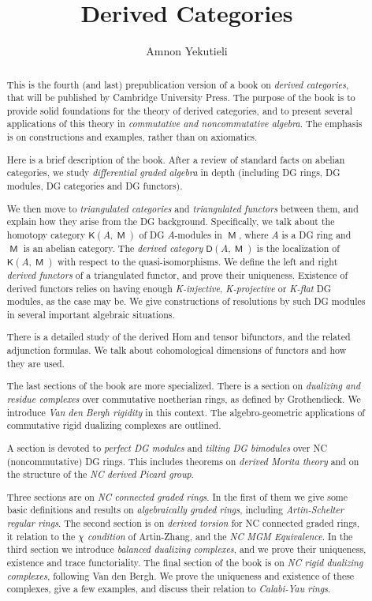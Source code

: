 \documentclass[10pt, a4paper]{amsart}
\title{Derived Categories}
\author{Amnon Yekutieli}
\theoremstyle{definition}
\numberwithin{equation}{subsection}
\newcommand{\opn}{\operatorname}
\newcommand{\cat}[1]{\opn{\mathsf{#1}}}
\newcommand{\dcat}[1]{\boldsymbol{\mathsf{#1}}}
\begin{document}
\begin{abstract}
This is the fourth (and last) prepublication version of a book on {\em derived 
categories}, that will be published by Cambridge University Press. 
The purpose of the book is to provide solid foundations for the theory of 
derived categories, and to present several applications of this theory 
in {\em commutative and noncommutative algebra}. The emphasis is on 
constructions and examples, rather than on axiomatics.  
 
Here is a brief description of the book. After a review of standard facts on 
abelian categories, we study {\em differential graded algebra} in depth 
(including DG rings, DG modules, DG categories and DG functors). 

We then move to {\em triangulated categories}  
and {\em triangulated functors} between them, and explain how they arise from 
the DG background. Specifically, we talk about the homotopy category 
$\dcat{K}(A, \cat{M})$ of DG $A$-modules in $\cat{M}$, where $A$ is a DG 
ring and $\cat{M}$ is an abelian category. 
The {\em derived category} $\dcat{D}(A, \cat{M})$ 
is the localization of $\dcat{K}(A, \cat{M})$ with respect to the 
quasi-isomorphisms. We define the left and right {\em derived functors} of a 
triangulated functor, and prove their uniqueness. Existence of derived 
functors relies on having enough {\em K-injective}, {\em 
K-projective} or {\em K-flat} DG modules, as the case may be. 
We give constructions of resolutions by such DG modules in 
several important algebraic situations. 

There is a detailed study of the derived Hom and tensor bifunctors, and the 
related adjunction formulas. We talk about cohomological dimensions of 
functors and how they are used. 

The last sections of the book are more specialized. 
There is a section on {\em dualizing and residue complexes} over commutative 
noetherian rings, as defined by Grothendieck. We introduce {\em Van den Bergh 
rigidity} in this context. The algebro-geometric applications of commutative 
rigid dualizing complexes are outlined. 

A section is devoted to {\em perfect DG modules} and {\em tilting DG bimodules} 
over NC (noncommutative) DG rings. This includes theorems on {\em derived 
Morita theory} and on the structure of the {\em NC derived Picard group}. 
 
Three sections are on {\em NC connected graded rings}. In the first of them we 
give some basic definitions and results on {\em algebraically graded rings}, 
including {\em Artin-Schelter regular rings}. The second section is on {\em 
derived torsion} for NC connected graded rings, it relation to 
the {\em $\chi$ condition} of Artin-Zhang, and the {\em NC MGM Equivalence}.
In the third section we introduce {\em balanced dualizing complexes}, and we 
prove their uniqueness, existence and trace functoriality.  
% 
The final section of the book is on {\em NC rigid dualizing complexes}, 
following Van den Bergh. We prove the uniqueness and existence of 
these complexes, give a few examples, and discuss their relation to {\em 
Calabi-Yau rings}. 


\end{abstract}
\end{document}
